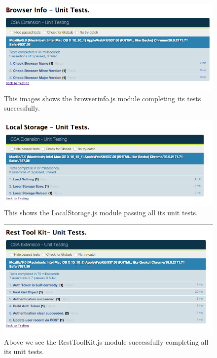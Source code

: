 \documentclass{article}
\begin{document}
\begin{figure}[!htbp]
\centering
\includegraphics[width=\textwidth]{biqunit}
\caption{This images shows the browserinfo.js module completing its tests successfully.}
\end{figure}

\begin{figure}[!htbp]
\centering
\includegraphics[width=\textwidth]{lsqunit}
\caption{This shows the LocalStorage.js module passing all its unit tests.}
\end{figure}

\begin{figure}[!htbp]
\centering
\includegraphics[width=\textwidth]{restqunit}
\caption{Above we see the RestToolKit.js module successfully completing all its unit tests.}
\end{figure}
\end{document}
